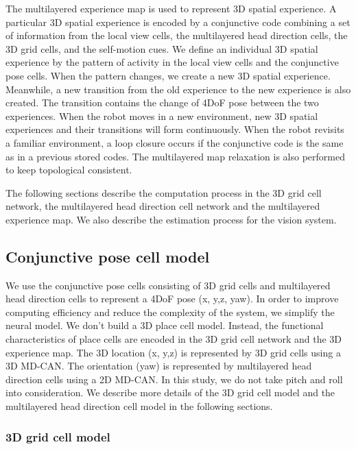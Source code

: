 The multilayered experience map is used to represent 3D spatial experience. 
A particular 3D spatial experience is encoded by a conjunctive code combining a set of information from the local view cells, the multilayered head direction cells, the 3D grid cells, and the self-motion cues. 
We define an individual 3D spatial experience by the pattern of activity in the local view cells and the conjunctive pose cells. 
When the pattern changes, we create a new 3D spatial experience. Meanwhile, a new transition from the old experience to the new experience is also created. 
The transition contains the change of 4DoF pose between the two experiences. 
When the robot moves in a new environment, new 3D spatial experiences and their transitions will form continuously. 
When the robot revisits a familiar environment, a loop closure occurs if the conjunctive code is the same as in a previous stored codes. 
The multilayered map relaxation is also performed to keep topological consistent.


The following sections describe the computation process in the 3D grid cell network, the multilayered head direction cell network and the multilayered experience map. 
We also describe the estimation process for the vision system.


\subsection{Conjunctive pose cell model}

We use the conjunctive pose cells consisting of 3D grid cells and multilayered head direction cells to represent a 4DoF pose (x, y,z, yaw). 
In order to improve computing efficiency and reduce the complexity of the system, we simplify the neural model. 
We don’t build a 3D place cell model. 
Instead, the functional characteristics of place cells are encoded in the 3D grid cell network and the 3D experience map. 
The 3D location (x, y,z) is represented by 3D grid cells using a 3D MD-CAN. 
The orientation (yaw) is represented by multilayered head direction cells using a 2D MD-CAN. 
In this study, we do not take pitch and roll into consideration. 
We describe more details of the 3D grid cell model and the multilayered head direction cell model in the following sections.


\subsubsection{3D grid cell model}

